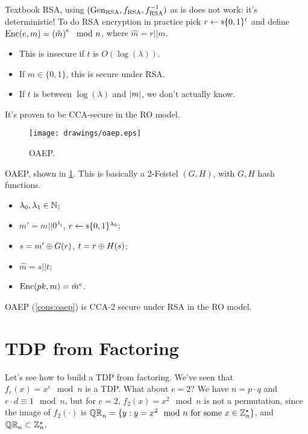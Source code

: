Textbook \ac{RSA}, \ie using $\RSAtuple$ as is does not work: it's deterministic!
To do \ac{RSA} encryption in practice pick $r \rand{\{0,1\}^{t}}$ and define $\Enc(e,m) = \left(\hat{m}\right)^{e} \mod n$, where $\hat{m} = r || m$.
\begin{itemize}
	\item This is insecure if $t$ is $O(\log(\lambda))$.
	\item If $m \in \{0,1\}$, this is secure under \ac{RSA}.
	\item If $t$ is between $\log(\lambda)$ and $\abs{m}$, we don't actually know.
\end{itemize}
It's proven to be \ac{CCA}-secure in the \ac{RO} model. 

\begin{construction} \label{cons:oaep}
	\begin{figure}
		\centering
		\texttt{[image: drawings/oaep.eps]}
		\caption{\acl{OAEP}.}
		\label{fig:oaep}
	\end{figure}
	\ac{OAEP}, shown in \cref{fig:oaep}.
	This is basically a 2-Feistel $(G,H)$, with $G,H$ hash functions.
	\begin{itemize}
		\item $\lambda_0, \lambda_1 \in \NaturalsZ$;
		\item $m' = m || 0^{\lambda_1}$, $r \rand{\{0,1\}^{\lambda_0}}$;
		\item $s = m' \xor G(r)$, $t = r \xor H(s)$;
		\item $\hat{m} = s || t$;
		\item $\Enc(\pk, m) = \hat{m}^{e}$. \qedhere
	\end{itemize}
\end{construction}

\begin{theorem}
	\ac{OAEP} (\cref{cons:oaep}) is \ac{CCA}-2 secure under \ac{RSA} in the \ac{RO} model.
\end{theorem}

\section{\acl{TDP} from Factoring}

Let's see how to build a \ac{TDP} from factoring.
We've seen that $f_e(x) = x^e \mod n$ is a \ac{TDP}.
What about $e = 2$?
We have $n = p \cdot q$ and $e \cdot d \equiv 1 \mod n$, but for $e = 2$, $f_2(x) = x^2 \mod n$ is not a permutation, since the image of $f_2(\cdot)$ is $\QR[n] = \{ y : y = x^2 \mod n \text{ for some } x \in \Integers_n^{\star}\}$, and $\QR[n] \subset \Integers_n^{\star}$.

